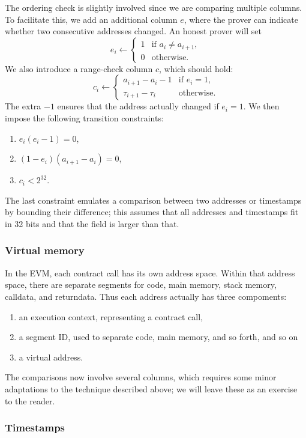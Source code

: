 The ordering check is slightly involved since we are comparing multiple columns. To facilitate this, we add an additional column $e$, where the prover can indicate whether two consecutive addresses changed. An honest prover will set
$$
e_i \leftarrow \begin{cases}
  1 & \text{if } a_i \neq a_{i + 1}, \\
  0 & \text{otherwise}.
\end{cases}
$$
We also introduce a range-check column $c$, which should hold:
$$
c_i \leftarrow \begin{cases}
  a_{i + 1} - a_i - 1 & \text{if } e_i = 1, \\
  \tau_{i+1} - \tau_i & \text{otherwise}.
\end{cases}
$$
The extra $-1$ ensures that the address actually changed if $e_i = 1$.
We then impose the following transition constraints:
\begin{enumerate}
  \item $e_i (e_i - 1) = 0$,
  \item $(1 - e_i) (a_{i + 1} - a_i) = 0$,
  \item $c_i < 2^{32}$.
\end{enumerate}
The last constraint emulates a comparison between two addresses or timestamps by bounding their difference; this assumes that all addresses and timestamps fit in 32 bits and that the field is larger than that.

\subsubsection{Virtual memory}

In the EVM, each contract call has its own address space. Within that address space, there are separate segments for code, main memory, stack memory, calldata, and returndata. Thus each address actually has three compoments:
\begin{enumerate}
  \item an execution context, representing a contract call,
  \item a segment ID, used to separate code, main memory, and so forth, and so on
  \item a virtual address.
\end{enumerate}
The comparisons now involve several columns, which requires some minor adaptations to the technique described above; we will leave these as an exercise to the reader.

\subsubsection{Timestamps}

